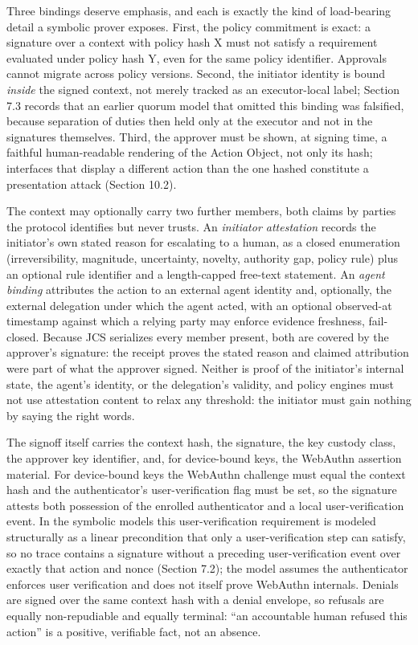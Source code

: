 \documentclass[11pt]{article}
\begin{document}
Three bindings deserve emphasis, and each is exactly the kind of load-bearing
detail a symbolic prover exposes. First, the policy commitment is exact: a
signature over a context with policy hash X must not satisfy a requirement
evaluated under policy hash Y, even for the same policy identifier. Approvals
cannot migrate across policy versions. Second, the initiator identity is bound
\emph{inside} the signed context, not merely tracked as an executor-local label;
Section 7.3 records that an earlier quorum model that omitted this binding was
falsified, because separation of duties then held only at the executor and not in
the signatures themselves. Third, the approver must be shown, at signing time, a
faithful human-readable rendering of the Action Object, not only its hash;
interfaces that display a different action than the one hashed constitute a
presentation attack (Section 10.2).

The context may optionally carry two further members, both claims by parties the
protocol identifies but never trusts. An \emph{initiator attestation} records the
initiator's own stated reason for escalating to a human, as a closed enumeration
(irreversibility, magnitude, uncertainty, novelty, authority gap, policy rule)
plus an optional rule identifier and a length-capped free-text statement. An
\emph{agent binding} attributes the action to an external agent identity and,
optionally, the external delegation under which the agent acted, with an optional
observed-at timestamp against which a relying party may enforce evidence
freshness, fail-closed. Because JCS serializes every member present, both are
covered by the approver's signature: the receipt proves the stated reason and
claimed attribution were part of what the approver signed. Neither is proof of the
initiator's internal state, the agent's identity, or the delegation's validity,
and policy engines must not use attestation content to relax any threshold: the
initiator must gain nothing by saying the right words.

The signoff itself carries the context hash, the signature, the key custody class,
the approver key identifier, and, for device-bound keys, the WebAuthn assertion
material. For device-bound keys the WebAuthn challenge must equal the context hash
and the authenticator's user-verification flag must be set, so the signature
attests both possession of the enrolled authenticator and a local user-verification
event. In the symbolic models this user-verification requirement is modeled
structurally as a linear precondition that only a user-verification step can
satisfy, so no trace contains a signature without a preceding user-verification
event over exactly that action and nonce (Section 7.2); the model assumes the
authenticator enforces user verification and does not itself prove WebAuthn
internals. Denials are signed over the same context hash with a denial envelope,
so refusals are equally non-repudiable and equally terminal: ``an accountable
human refused this action'' is a positive, verifiable fact, not an absence.
\end{document}

